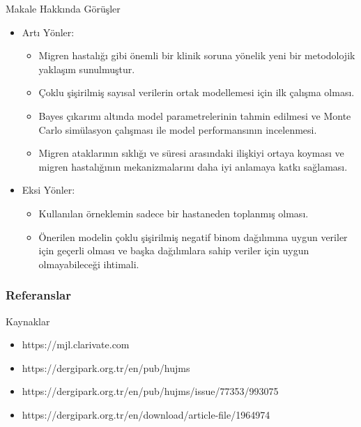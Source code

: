 \documentclass{beamer}
\begin{document}
\begin{frame}{Makale Hakkında Görüşler}
\begin{itemize}
  \item Artı Yönler:
  \begin{itemize}
    \item Migren hastalığı gibi önemli bir klinik soruna yönelik yeni bir metodolojik yaklaşım sunulmuştur.
    \item Çoklu şişirilmiş sayısal verilerin ortak modellemesi için ilk çalışma olması.
    \item Bayes çıkarımı altında model parametrelerinin tahmin edilmesi ve Monte Carlo simülasyon çalışması ile model performansının incelenmesi.
    \item Migren ataklarının sıklığı ve süresi arasındaki ilişkiyi ortaya koyması ve migren hastalığının mekanizmalarını daha iyi anlamaya katkı sağlaması.
  \end{itemize}
  \item Eksi Yönler:
  \begin{itemize}
    \item Kullanılan örneklemin sadece bir hastaneden toplanmış olması.
    \item Önerilen modelin çoklu şişirilmiş negatif binom dağılımına uygun veriler için geçerli olması ve başka dağılımlara sahip veriler için uygun olmayabileceği ihtimali.
  \end{itemize}
\end{itemize}
\end{frame}

\begin{frame}
\frametitle{Referanslar}


\nocite{*}




\end{frame}


\begin{frame}{Kaynaklar}
\begin{itemize}
  \item https://mjl.clarivate.com
  \item https://dergipark.org.tr/en/pub/hujms
  \item https://dergipark.org.tr/en/pub/hujms/issue/77353/993075
  \item https://dergipark.org.tr/en/download/article-file/1964974
\end{itemize}
\end{frame}
\end{document}
